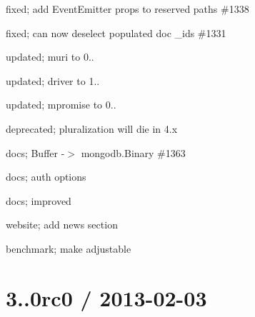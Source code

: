\begin{DoxyItemize}
\item fixed; add Event\+Emitter props to reserved paths \#1338
\item fixed; can now deselect populated doc \+\_\+ids \#1331
\item updated; muri to 0..
\item updated; driver to 1..
\item updated; mpromise to 0..
\item deprecated; pluralization will die in 4.\+x
\item docs; Buffer -\/$>$ mongodb.\+Binary \#1363
\item docs; auth options
\item docs; improved
\item website; add news section
\item benchmark; make adjustable
\end{DoxyItemize}

\section*{3..\+0rc0 / 2013-\/02-\/03 }


